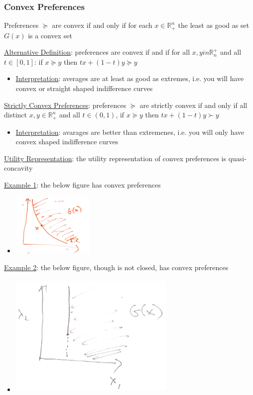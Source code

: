 \documentclass{article}
\begin{document}
\subsubsection{Convex Preferences}
Preferences $\succeq$ are convex if and only if for each $x \in \mathbb{R}_{+}^{n}$ the least as good as set $G(x)$ is a convex set \par \vspace{0.3em}
  \underline{Alternative Definition}: preferences are convex if and if for all $x, yin \mathbb{R}_{n}^{+}$ and all $t \in [0,1]$: if $x \succeq y$ then $tx + (1-t)y \succeq y$
  \begin{itemize}
    \item  \underline{Interpretation}: averages are at least as good as extremes, i.e. you will have convex or straight shaped indifference curves
  \end{itemize}
  \par
  \underline{Strictly Convex Preferences}: preferences $\succeq$ are strictly convex if and only if all distinct $x,y \in \mathbb{R}_{+}^{n}$ and all $t \in (0,1)$, if $x \succeq y$ then $tx + (1-t)y \succ y$
  \begin{itemize}
    \item  \underline{Interpretation}: avarages are better than extremenes, i.e. you will only have convex shaped indifference curves
  \end{itemize}
  \par
  \underline{Utility Representation}: the utility representation of convex preferences is quasi-concavity
  \par
  \underline{Example 1}: the below figure has convex preferences
  \begin{itemize}
    \item  \includegraphics[width=4cm, height=3cm]{pic16}
  \end{itemize}
  \par
  \underline{Example 2}: the below figure, though is not closed, has convex preferences
  \begin{itemize}
    \item  \includegraphics[width=8cm, height=6cm]{pic17}
  \end{itemize}
\end{document}
